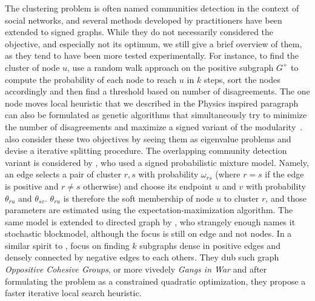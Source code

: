 The clustering problem is often named communities detection in the context of social networks, and
several methods developed by practitioners have been extended to signed graphs. While they do not
necessarily considered the \pcc{} objective, and especially not its optimum, we still give a brief
overview of them, as they tend to have been more tested experimentally. For instance, to find the
cluster of node $u$, \textcite{Yang2007} use a random walk approach on the positive subgraph $G^+$
to compute the probability of each node to reach $u$ in $k$ steps, sort the nodes accordingly and
then find a threshold  based on number of disagreements.
The one node moves local heuristic that we described in the Physics inspired paragraph
 can also be formulated as genetic algorithms that simultaneously try to
minimize the number of disagreements and maximize a signed variant of the
modularity~\autocites{Li2013}{Amelio2013}. \Textcite{Anchuri2012} also consider these two objectives
by seeing them as eigenvalue problems and devise a iterative splitting procedure.
The overlapping community detection variant is considered by \textcite{Chen14}, who used a signed
probabilistic mixture model. Namely, an edge selects a pair of cluster $r,s$ with probability
$\omega_{rs}$ (where $r=s$ if the edge is positive and $r\neq s$ otherwise) and choose its endpoint
$u$ and $v$ with probability $\theta_{ru}$ and $\theta_{sv}$. $\theta_{ru}$ is therefore the soft
membership of node $u$ to cluster $r$, and those parameters are estimated using the
expectation-maximization algorithm. The same model is extended to directed graph by
\textcite{Jiang2015}, who strangely enough names it stochastic blockmodel, although the focus is
still on edge and not nodes.
In a similar spirit to \maxa{}, \textcite{SignedGang} focus on finding $k$ subgraphs dense in
positive edges and densely connected by negative edges to each others. They dub such graph
\emph{Oppositive Cohesive Groups}, or more vivedely \emph{Gangs in War} and after formulating the
problem as a constrained quadratic optimization, they propose a faster iterative local search
heuristic.
